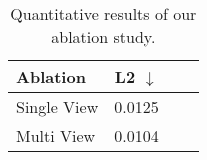 \begin{table}[ht]
    \centering
    \caption{Quantitative results of our ablation study.}
    \label{tab:ablation2}
    \begin{tabular}{@{}lccc@{}} %
        \toprule
        \textbf{Ablation} & \textbf{L2 $\downarrow$} \\
        \midrule
            Single View & 0.0125  \\
        Multi View  & 0.0104 \\

        \bottomrule
    \end{tabular}
\end{table}
